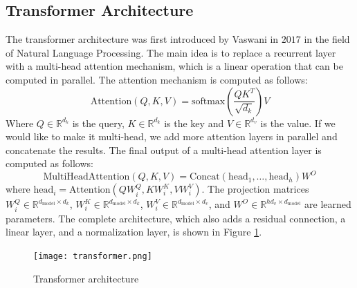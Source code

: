 \subsection{Transformer Architecture}
The transformer architecture was first introduced by Vaswani \etal
\cite{vaswani2017attention} in $2017$ in the field of Natural Language
Processing. The main idea is to replace a recurrent layer with a multi-head
attention mechanism, which is a linear operation that can be computed in
parallel.
The attention mechanism is computed as follows:
\begin{equation}
  \label{eq:attention}
  \text{Attention}(Q,K,V) = \text{softmax}(\frac{QK^T}{\sqrt{d_k}})V
\end{equation}
Where $Q \in \mathbb{R}^{d_k}$ is the query, $K \in \mathbb{R}^{d_k}$ is the key
and $V \in \mathbb{R}^{d_v}$ is the value. If we would like to make it
multi-head, we add more attention layers in parallel and concatenate the
results. The final output of a multi-head attention layer is computed as
follows:
\begin{equation}
  \label{eq:multiheadattention}
  \text{MultiHeadAttention}(Q,K,V) = \text{Concat}(\text{head}_1, \dots,
  \text{head}_h)W^O
\end{equation}
where $\text{head}_i = \text{Attention}(QW_i^Q, KW_i^K, VW_i^V)$.
The projection matrices $W_i^Q \in \mathbb{R}^{d_{\text{model}} \times d_k}$,
$W_i^K \in \mathbb{R}^{d_{\text{model}} \times d_k}$, $W_i^V \in
\mathbb{R}^{d_{\text{model}} \times d_v}$, and $W^O \in \mathbb{R}^{hd_v \times
d_\text{model}}$ are learned parameters. The complete architecture, which also
adds a residual connection, a linear layer, and a normalization layer, is shown
in Figure \ref{fig:transformer}.
\begin{figure}[h]
  \centering
  \texttt{[image: transformer.png]}
  \caption{Transformer architecture}
  \label{fig:transformer}
\end{figure}

